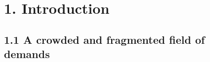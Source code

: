 
\section{1. Introduction}\label{introduction}

\subsection{1.1 A crowded and fragmented field of
demands}\label{a-rising-tide-of-sustainability-demands}

